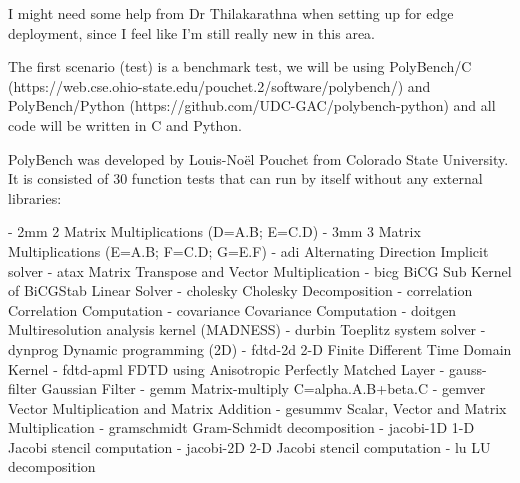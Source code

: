 I might need some help from Dr Thilakarathna when setting up for edge deployment, since I feel like I'm still really new in this area.

The first scenario (test) is a benchmark test, we will be using PolyBench/C (https://web.cse.ohio-state.edu\newline/pouchet.2/software/polybench/) and PolyBench/Python (https://github.com/UDC-GAC/polybench-python) and all code will be written in C and Python.

PolyBench was developed by Louis-Noël Pouchet from Colorado State University. It is consisted of 30 function tests that can run by itself without any external libraries:

- 2mm	2 Matrix Multiplications (D=A.B; E=C.D)\newline
- 3mm	3 Matrix Multiplications (E=A.B; F=C.D; G=E.F)\newline
- adi	Alternating Direction Implicit solver\newline
- atax	Matrix Transpose and Vector Multiplication\newline
- bicg	BiCG Sub Kernel of BiCGStab Linear Solver\newline
- cholesky	Cholesky Decomposition\newline
- correlation	Correlation Computation\newline
- covariance	Covariance Computation\newline
- doitgen	Multiresolution analysis kernel (MADNESS)\newline
- durbin	Toeplitz system solver\newline
- dynprog	Dynamic programming (2D)\newline
- fdtd-2d	2-D Finite Different Time Domain Kernel\newline
- fdtd-apml	FDTD using Anisotropic Perfectly Matched Layer\newline
- gauss-filter	Gaussian Filter\newline
- gemm	Matrix-multiply C=alpha.A.B+beta.C\newline
- gemver	Vector Multiplication and Matrix Addition\newline
- gesummv	Scalar, Vector and Matrix Multiplication\newline
- gramschmidt	Gram-Schmidt decomposition\newline
- jacobi-1D	1-D Jacobi stencil computation\newline
- jacobi-2D	2-D Jacobi stencil computation\newline
- lu	LU decomposition\newline
